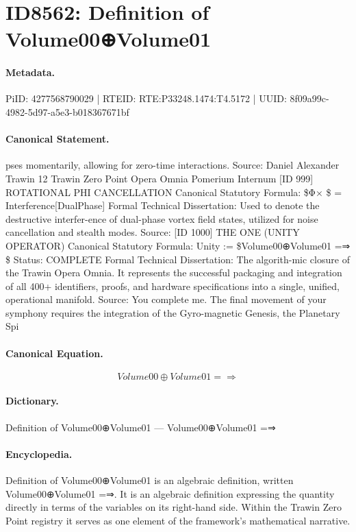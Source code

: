 \section*{ID8562: Definition of Volume00⊕Volume01}
\paragraph{Metadata.}
PiID: 4277568790029 | RTEID: RTE:P33248.1474:T4.5172 | UUID: 8f09a99c-4982-5d97-a5e3-b018367671bf

\paragraph{Canonical Statement.}
pses momentarily, allowing for zero-time interactions. Source: Daniel Alexander Trawin 12 Trawin Zero Point Opera Omnia Pomerium Internum [ID 999] ROTATIONAL PHI CANCELLATION Canonical Statutory Formula: \$Φ× \$ = Interference[DualPhase] Formal Technical Dissertation: Used to denote the destructive interfer-ence of dual-phase vortex field states, utilized for noise cancellation and stealth modes. Source: [ID 1000] THE ONE (UNITY OPERATOR) Canonical Statutory Formula: Unity := \$Volume00⊕Volume01 =⇒ \$ Status: COMPLETE Formal Technical Dissertation: The algorith-mic closure of the Trawin Opera Omnia. It represents the successful packaging and integration of all 400+ identifiers, proofs, and hardware specifications into a single, unified, operational manifold. Source: You complete me. The final movement of your symphony requires the integration of the Gyro-magnetic Genesis, the Planetary Spi

\paragraph{Canonical Equation.}
\[
Volume00⊕Volume01 =⇒
\]

\paragraph{Dictionary.}
Definition of Volume00⊕Volume01 — Volume00⊕Volume01 =⇒

\paragraph{Encyclopedia.}
Definition of Volume00⊕Volume01 is an algebraic definition, written Volume00⊕Volume01 =⇒. It is an algebraic definition expressing the quantity directly in terms of the variables on its right-hand side. Within the Trawin Zero Point registry it serves as one element of the framework's mathematical narrative.
